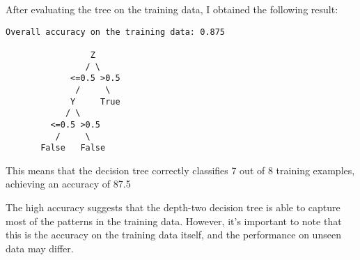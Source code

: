 \documentclass{article}
\begin{document}
After evaluating the tree on the training data, I obtained the following result:

\begin{verbatim}
Overall accuracy on the training data: 0.875

                 Z
                / \
             <=0.5 >0.5
              /     \
             Y     True
            / \
         <=0.5 >0.5
          /     \
       False   False
\end{verbatim}

This means that the decision tree correctly classifies 7 out of 8 training examples, achieving an accuracy of 87.5%

The high accuracy suggests that the depth-two decision tree is able to capture most of the patterns in the training data. However, it's important to note that this is the accuracy on the training data itself, and the performance on unseen data may differ.
\end{document}
